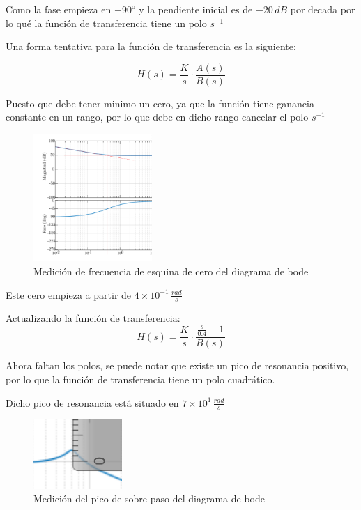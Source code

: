 Como la fase empieza en $-90^\mathrm{o}$ y la pendiente inicial 
es de $-20\,dB$ por decada por lo qué la función de transferencia tiene
un polo $s^{-1}$

Una forma tentativa para la función de transferencia es la siguiente:

\begin{equation*}
    H(s) = \dfrac{K}{s} \cdot \dfrac{A(s)}{B(s)}
\end{equation*}

Puesto que debe tener minimo un cero, ya que la función tiene ganancia
constante en un rango, por lo que debe en dicho rango cancelar el polo $s^{-1}$
\\

\begin{figure}[H]
    \centering
    \includegraphics[width=0.4\textwidth]{imagenes/esquina_cero.png}
    \caption{
        Medición de frecuencia de esquina de cero del diagrama de bode
    }\label{fig:cero}
\end{figure}

Este cero empieza a partir de $4\times 10^{-1} \, \frac{rad}{s}$

Actualizando la función de transferencia:
\begin{equation*}
    H(s) = \dfrac{K}{s} \cdot \dfrac{\frac{s}{0{.}4} + 1}{B(s)}
\end{equation*}

Ahora faltan los polos, se puede notar que existe un pico de resonancia
positivo, por lo que la función de transferencia tiene un polo cuadrático.

Dicho pico de resonancia está situado en $7\times 10^{1} \, \frac{rad}{s}$

\begin{figure}[H]
    \centering
    \includegraphics[width=0.3\textwidth]{imagenes/medicion_mr.png}
    \caption{
        Medición del pico de sobre paso del diagrama de bode
    }\label{fig:mp}
\end{figure}

